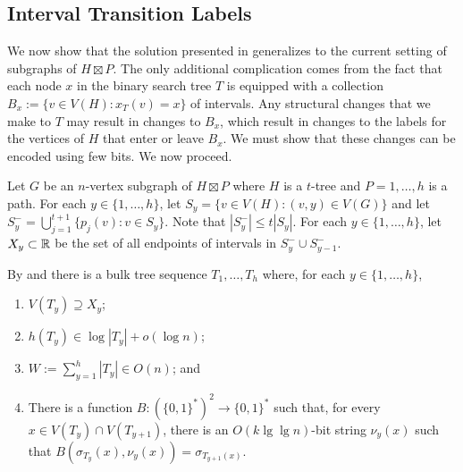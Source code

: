 \documentclass[kpfonts]{patmorin}
\begin{document}
\subsection{Interval Transition Labels}


We now show that the solution presented in  generalizes to the current setting of subgraphs of $H\boxtimes P$.  The only additional complication comes from the fact that each node $x$ in the binary search tree $T$ is equipped with a collection $B_x:=\{v\in V(H):x_T(v)=x\}$ of intervals.  Any structural changes that we make to $T$ may result in changes to $B_x$, which result in changes to the labels for the vertices of $H$ that enter or leave $B_x$.  We must show that these changes can be encoded using few bits.  We now proceed.

Let $G$ be an $n$-vertex subgraph of $H\boxtimes P$ where $H$ is a $t$-tree and $P=1,\ldots,h$ is a path. For each $y\in\{1,\ldots,h\}$, let $S_y=\{v\in V(H): (v,y)\in V(G)\}$ and let $S^-_y=\bigcup_{j=1}^{t+1}\{p_j(v):v\in S_y\}$.  Note that $|S^-_y|\le t|S_y|$. For each $y\in\{1,\ldots,h\}$, let $X_y\subset\mathbb{R}$ be the set of all endpoints of intervals in $S^-_y\cup S^-_{y-1}$.

By  and  there is a bulk tree sequence $T_1,\ldots,T_h$ where, for each $y\in\{1,\ldots,h\}$, 
\begin{enumerate}[(PR1)]
  \item $V(T_y)\supseteq X_y$;
  \item $h(T_y)\in \log |T_y| + o(\log n)$;
  \item $W:=\sum_{y=1}^h |T_y|\in O(n)$; and
  \item There is a function $B:(\{0,1\}^*)^2\to\{0,1\}^*$ such that, for every $x\in V(T_y)\cap V(T_{y+1})$, there is an $O(k\lg\lg n)$-bit string $\nu_y(x)$ such that $B(\sigma_{T_y}(x),\nu_y(x))=\sigma_{T_{y+1}(x)}$.
\end{enumerate}
\end{document}
